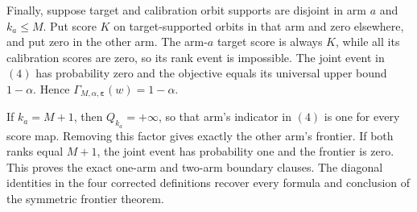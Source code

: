 Finally, suppose target and calibration orbit supports are disjoint in arm \(a\) and \(k_a\le M\). Put score \(K\) on target-supported orbits in that arm and zero elsewhere, and put zero in the other arm. The arm-\(a\) target score is always \(K\), while all its calibration scores are zero, so its rank event is impossible. The joint event in \((4)\) has probability zero and the objective equals its universal upper bound \(1-\alpha\). Hence \(\Gamma_{M,\alpha,\boldsymbol\varepsilon}(w)=1-\alpha\).

If \(k_a=M+1\), then \(Q_{k_a}=+\infty\), so that arm's indicator in \((4)\) is one for every score map. Removing this factor gives exactly the other arm's frontier. If both ranks equal \(M+1\), the joint event has probability one and the frontier is zero. This proves the exact one-arm and two-arm boundary clauses. The diagonal identities in the four corrected definitions recover every formula and conclusion of the symmetric frontier theorem.
